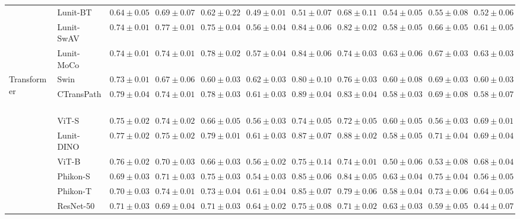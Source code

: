 \begin{tabular}{ll|cccc|c|cccc}
 & Lunit-BT~\cite{kang2023benchmarking} & $0.64 \pm 0.05$ & $0.69 \pm 0.07$ & $0.62 \pm 0.22$ & $0.49 \pm 0.01$ & $0.51 \pm 0.07$ & $0.68 \pm 0.11$ & $0.54 \pm 0.05$ & $0.55 \pm 0.08$ & $0.52 \pm 0.06$ \\
 & Lunit-SwAV~\cite{kang2023benchmarking} & $0.74 \pm 0.01$ & $0.77 \pm 0.01$ & $0.75 \pm 0.04$ & $0.56 \pm 0.04$ & $0.84 \pm 0.06$ & $0.82 \pm 0.02$ & $0.58 \pm 0.05$ & $0.66 \pm 0.05$ & $0.61 \pm 0.05$ \\
 & Lunit-MoCo~\cite{kang2023benchmarking} & $0.74 \pm 0.01$ & $0.74 \pm 0.01$ & $0.78 \pm 0.02$ & $0.57 \pm 0.04$ & $0.84 \pm 0.06$ & $0.74 \pm 0.03$ & $\mathbf{0.63 \pm 0.06}$ & $0.67 \pm 0.03$ & $0.63 \pm 0.03$ \\
\cline{1-11}
\multirow[t]{12}{*}{Transformer} & Swin~\cite{liu2021swin} & $0.73 \pm 0.01$ & $0.67 \pm 0.06$ & $0.60 \pm 0.03$ & $0.62 \pm 0.03$ & $0.80 \pm 0.10$ & $0.76 \pm 0.03$ & $0.60 \pm 0.08$ & $0.69 \pm 0.03$ & $0.60 \pm 0.03$ \\
 & CTransPath~\cite{wang2022transformer} & $\mathbf{0.79 \pm 0.04}$ & $0.74 \pm 0.01$ & $0.78 \pm 0.03$ & $0.61 \pm 0.03$ & $\mathbf{0.89 \pm 0.04}$ & $0.83 \pm 0.04$ & $0.58 \pm 0.03$ & $0.69 \pm 0.08$ & $0.58 \pm 0.07$ \\
 & ViT-S~\cite{kolesnikov2021image} & $0.75 \pm 0.02$ & $0.74 \pm 0.02$ & $0.66 \pm 0.05$ & $0.56 \pm 0.03$ & $0.74 \pm 0.05$ & $0.72 \pm 0.05$ & $0.60 \pm 0.05$ & $0.56 \pm 0.03$ & $\mathbf{0.69 \pm 0.01}$ \\
 & Lunit-DINO~\cite{kang2023benchmarking} & $0.77 \pm 0.02$ & $0.75 \pm 0.02$ & $0.79 \pm 0.01$ & $0.61 \pm 0.03$ & $0.87 \pm 0.07$ & $\mathbf{0.88 \pm 0.02}$ & $0.58 \pm 0.05$ & $0.71 \pm 0.04$ & $0.69 \pm 0.04$ \\
 & ViT-B~\cite{kolesnikov2021image} & $0.76 \pm 0.02$ & $0.70 \pm 0.03$ & $0.66 \pm 0.03$ & $0.56 \pm 0.02$ & $0.75 \pm 0.14$ & $0.74 \pm 0.01$ & $0.50 \pm 0.06$ & $0.53 \pm 0.08$ & $0.68 \pm 0.04$ \\
 & Phikon-S~\cite{filiot2023scaling} & $0.69 \pm 0.03$ & $0.71 \pm 0.03$ & $0.75 \pm 0.03$ & $0.54 \pm 0.03$ & $0.85 \pm 0.06$ & $0.84 \pm 0.05$ & $0.63 \pm 0.04$ & $\mathbf{0.75 \pm 0.04}$ & $0.56 \pm 0.05$ \\
 & Phikon-T~\cite{filiot2023scaling} & $0.70 \pm 0.03$ & $0.74 \pm 0.01$ & $0.73 \pm 0.04$ & $0.61 \pm 0.04$ & $0.85 \pm 0.07$ & $0.79 \pm 0.06$ & $0.58 \pm 0.04$ & $0.73 \pm 0.06$ & $0.64 \pm 0.05$ \\
 & ResNet-50~\cite{he2015deep} & $0.71 \pm 0.03$ & $0.69 \pm 0.04$ & $0.71 \pm 0.03$ & $\mathbf{0.64 \pm 0.02}$ & $0.75 \pm 0.08$ & $0.71 \pm 0.02$ & $0.63 \pm 0.03$ & $0.59 \pm 0.05$ & $0.44 \pm 0.07$ \\

\end{tabular}
